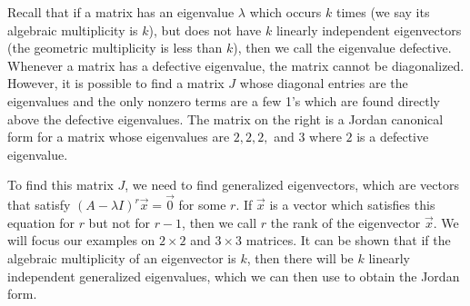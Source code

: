 Recall that if a matrix has an eigenvalue $\lambda$ which occurs $k$ times (we say its algebraic multiplicity is $k$), but does not have $k$ linearly independent eigenvectors (the geometric multiplicity is less than $k$), then we call the eigenvalue defective. 
Whenever a matrix has a defective eigenvalue, the matrix cannot be diagonalized. 
However, it is possible to find a matrix $J$ whose diagonal entries are the eigenvalues and the only nonzero terms are a few 1's which are found directly above the defective eigenvalues. 
The matrix on the right is a Jordan canonical form for a matrix whose eigenvalues are $2,2,2,$ and $3$ where $2$ is a defective eigenvalue. 

To find this matrix $J$, we need to find generalized eigenvectors, which are vectors that satisfy $(A-\lambda I)^r\vec x=\vec 0$ for some $r$.  If $\vec x$ is a vector which satisfies this equation for $r$ but not for $r-1$, then we call $r$ the rank of the eigenvector $\vec x$. We will focus our examples on $2\times 2$ and $3\times 3$ matrices. It can be shown that if the algebraic multiplicity of an eigenvector is $k$, then there will be $k$ linearly independent generalized eigenvalues, which we can then use to obtain the Jordan form.

